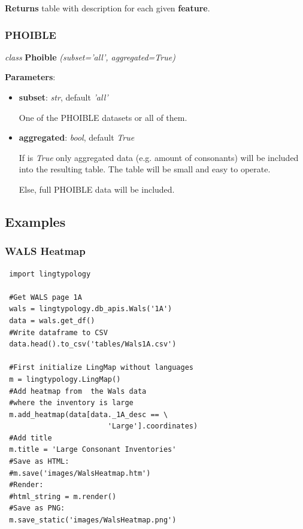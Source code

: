 \documentclass[a4paper,12pt]{article}
\begin{document}
\textbf{Returns} table with description for each given \textbf{feature}.

\subsubsection{PHOIBLE}

\textit{class} \textbf{Phoible} \textit{(subset='all', aggregated=True)}
\medskip

\textbf{Parameters}:
\begin{itemize}
 \item \textbf{subset}: \textit{str}, default \textit{'all'}
 
 One of the PHOIBLE datasets or all of them.
 \item \textbf{aggregated}: \textit{bool}, default \textit{True}
 
 If is \textit{True} only aggregated data (e.g. amount of consonants) will be included into the resulting table. The table will be small and easy to operate.
 
 Else, full PHOIBLE data will be included.
\end{itemize}


\subsection{Examples}

\subsubsection{WALS Heatmap}

\noindent
\begin{minipage}{\textwidth}
\begin{lstlisting}
 import lingtypology

 #Get WALS page 1A
 wals = lingtypology.db_apis.Wals('1A')
 data = wals.get_df()
 #Write dataframe to CSV
 data.head().to_csv('tables/Wals1A.csv')
 
 #First initialize LingMap without languages
 m = lingtypology.LingMap()
 #Add heatmap from  the Wals data
 #where the inventory is large
 m.add_heatmap(data[data._1A_desc == \
                        'Large'].coordinates)
 #Add title
 m.title = 'Large Consonant Inventories'
 #Save as HTML:
 #m.save('images/WalsHeatmap.htm')
 #Render:
 #html_string = m.render()
 #Save as PNG:
 m.save_static('images/WalsHeatmap.png')
\end{lstlisting}
\end{minipage}
\end{document}
